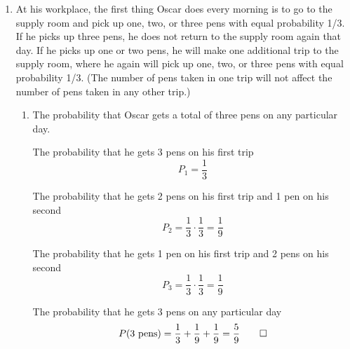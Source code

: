 \documentclass[paper=usletter, fontsize=12pt]{article}
\begin{document}
    \vspace{-0.2in}

    \begin{enumerate}

        \item
        At his workplace, the first thing Oscar does every morning is to go to
        the supply room and pick up one, two, or three pens with equal
        probability 1/3. If he picks up three pens, he does not return to the
        supply room again that day. If he picks up one or two pens, he will
        make one additional trip to the supply room, where he again will pick
        up one, two, or three pens with equal probability 1/3. (The number of
        pens taken in one trip will not affect the number of pens taken in any
        other trip.)

        \begin{enumerate}

            \item The probability that Oscar gets a total of three pens on any
            particular day.
            \begin{cproof}

                The probability that he gets 3 pens on his first trip
                \begin{equation*}
                    P_1 = \frac{1}{3}
                \end{equation*}

                The probability that he gets 2 pens on his first trip and 1 pen
                on his second
                \begin{equation*}
                    P_2 = \frac{1}{3}\cdot\frac{1}{3}=\frac{1}{9}
                \end{equation*}

                The probability that he gets 1 pen on his first trip and 2 pens
                on his second
                \begin{equation*}
                    P_3 = \frac{1}{3}\cdot\frac{1}{3}=\frac{1}{9}
                \end{equation*}

                The probability that he gets 3 pens on any particular day
                \begin{equation*}
                    P(\text{3 pens}) = \frac{1}{3}+\frac{1}{9}+\frac{1}{9}=\frac{5}{9} \qedhere
                \end{equation*}


\end{cproof}
\end{enumerate}
\end{enumerate}
\end{document}

